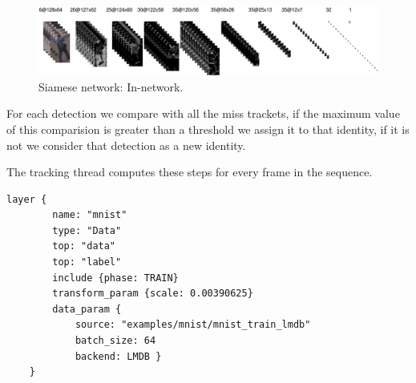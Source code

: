 \begin{figure}[hptb]
\centering         
\includegraphics[width=16cm]{timesDiagram/network.png}
\caption{Siamese network: In-network.} \label{saimss}
\end{figure}


For each detection we compare with all the miss trackets, if the maximum value of this  comparision is greater than a threshold we assign it to that identity, if it is not we consider that detection as a new identity.


The tracking thread computes these steps for every frame in the sequence.



	\vspace{10pt}
	\begin{lstlisting}[frame=single]
	layer {
		name: "mnist"
		type: "Data"
		top: "data"
		top: "label"
		include {phase: TRAIN}
		transform_param {scale: 0.00390625}
		data_param {
			source: "examples/mnist/mnist_train_lmdb"
			batch_size: 64
			backend: LMDB }
	}
	\end{lstlisting}
	